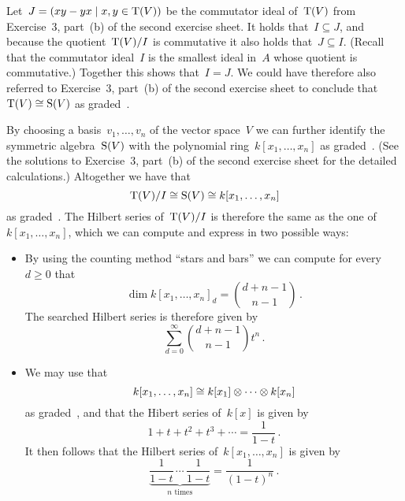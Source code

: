 \begin{remark}
  Let~$J = \genideal{xy - yx \suchthat x, y \in \Tensor(V)}$ be the commutator ideal of~$\operatorname{T}(V)$ from Exercise~3, part~(b) of the second exercise sheet.
  It holds that~$I \subseteq J$, and because the quotient~$\operatorname{T}(V)/I$ is commutative it also holds that~$J \subseteq I$.
  (Recall that the commutator ideal~$I$ is the smallest {\twosided} ideal in~$A$ whose quotient is commutative.)
  Together this shows that~$I = J$.
  We could have therefore also referred to Exercise~3, part~(b) of the second exercise sheet to conclude that~$\operatorname{T}(V) \cong \operatorname{S}(V)$ as graded~{\kalgs}.
\end{remark}

By choosing a basis~$v_1, \dotsc, v_n$ of the vector space~$V$ we can further identify the symmetric algebra~$\operatorname{S}(V)$ with the polynomial ring~$k[x_1, \dotsc, x_n]$ as graded~{\kalgs}.
(See the solutions to Exercise~3, part~(b) of the second exercise sheet for the detailed calculations.)
Altogether we have that
\[
        \operatorname{T}(V)/I
  \cong \operatorname{S}(V)
  \cong k[x_1, \dotsc, x_n]
\]
as graded~{\kalgs}.
The Hilbert series of~$\operatorname{T}(V)/I$ is therefore the same as the one of~$k[x_1, \dotsc, x_n]$, which we can compute and express in two possible ways:

\begin{itemize}
  \item
    By using the counting method \enquote{stars and bars} we can compute for every~$d \geq 0$ that
    \[
        \dim k[x_1, \dotsc, x_n]_d
      = \binom{d + n-1}{n-1} \,.
    \]
    The searched Hilbert series is therefore given by
    \[
      \sum_{d=0}^\infty \binom{d + n-1}{n-1} t^n \,.
    \]
  \item
    We may use that
    \[
            k[x_1, \dotsc, x_n]
      \cong k[x_1] \otimes \dotsb \otimes k[x_n]
    \]
    as graded~{\kalgs}, and that the Hibert series of~$k[x]$ is given by
    \[
        1 + t + t^2 + t^3 + \dotsb
      = \frac{1}{1-t} \,.
    \]
    It then follows that the Hilbert series of~$k[x_1, \dotsc, x_n]$ is given by
    \[
        \underbrace{\frac{1}{1-t} \, \dotsm \, \frac{1}{1-t}}_{\text{$n$ times}}
      = \frac{1}{(1-t)^n} \,.
    \]
\end{itemize}






